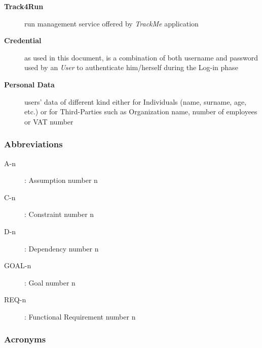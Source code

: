 \documentclass[a4paper]{article}
\begin{document}
\begin{description}
                    \item[\textbf{Track4Run}] run management service offered by \textit{TrackMe} application
                    
                    \item[\textbf{Credential}] as used in this document, is a combination of both username and password used by an \textit{User} to authenticate him/herself during the Log-in phase
                    
                    \item[\textbf{Personal Data}] users' data of different kind either for Individuals (name, surname, age, etc.) or for Third-Parties such as Organization name, number of employees or VAT number
                \end{description}
                
            \subsubsection{Abbreviations}
            \begin{description}
                \item[A-n]: Assumption number n
                \item[C-n]: Constraint number n
                \item[D-n]: Dependency number n
                \item[GOAL-n]: Goal number n
                 \item [REQ-n]: Functional Requirement number n
            \end{description}
            
            \subsubsection{Acronyms}
            \begin{acronym}
            \end{acronym}
            
\end{document}
